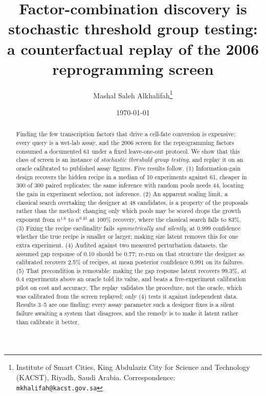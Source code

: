 \documentclass[11pt]{article}
\title{\textbf{Factor-combination discovery is stochastic threshold group
testing: a counterfactual replay of the 2006 reprogramming screen}}
\author{Mashal Saleh Alkhalifah\thanks{Institute of Smart Cities, King
Abdulaziz City for Science and Technology (KACST), Riyadh, Saudi Arabia.
Correspondence: \texttt{mkhalifah@kacst.gov.sa}}}
\date{\today}
\begin{document}
\maketitle

\begin{abstract}
\noindent
Finding the few transcription factors that drive a cell-fate conversion is
expensive: every query is a wet-lab assay, and the 2006 screen for the
reprogramming factors consumed a documented 61 under a fixed leave-one-out
protocol. We show that this class of screen is an instance of
\emph{stochastic threshold group testing}, and replay it on an oracle
calibrated to published assay figures. Five results follow.
(1) Information-gain design recovers the hidden recipe in a median of 10
experiments against 61, cheaper in 300 of 300 paired replicates; the same
inference with random pools needs 44, locating the gain in experiment
selection, not inference. (2) An apparent scaling limit, a
classical search overtaking the designer at 48 candidates, is a property of
the proposals rather than the method: changing only which pools may be scored
drops the growth exponent from $n^{1.6}$ to $n^{0.43}$ at 100\%
recovery, where the classical search falls to 83\%. (3) Fixing the recipe
cardinality fails \emph{symmetrically and silently}, at 0.999 confidence
whether the true recipe is smaller or larger; making size latent removes this
for one extra experiment. (4) Audited against two measured perturbation datasets, the
assumed gap response of 0.10 should be 0.77; re-run on that structure the
designer as calibrated recovers 2.5\% of recipes, at mean posterior confidence
0.991 on its failures. (5) That precondition is removable: making the gap
response latent recovers 99.3\%, at 0.4 experiments above an oracle told its
value, and beats a five-experiment calibration pilot on cost and accuracy. The
replay validates the procedure, not the oracle, which was calibrated from the
screen replayed; only (4) tests it against independent data. Results 3--5 are one finding: every assay parameter such a designer fixes is a
silent failure awaiting a system that disagrees, and the remedy is to make it
latent rather than calibrate it better.
\end{abstract}
\end{document}
